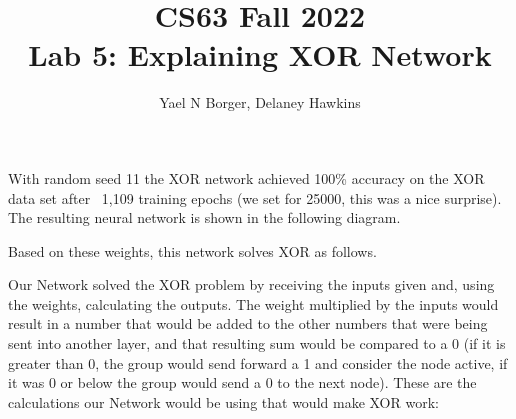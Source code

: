 \documentclass[11pt]{article}
\title{CS63 Fall 2022\\Lab 5: Explaining XOR Network}
\author{Yael N Borger, Delaney Hawkins}
\begin{document}
\maketitle

With random seed 11
the XOR network achieved 100\% accuracy on the XOR data set after
\ 1,109 %
training epochs (we set for 25000, this was a nice surprise).  The resulting neural network is shown in the
following diagram.

\begin{center}
\end{center}

Based on these weights, this network solves XOR as follows.

Our Network solved the XOR problem by receiving the inputs given and, using the weights, calculating the outputs. The weight multiplied by the inputs would result in a number that would be added to the other numbers that were being sent into another layer, and that resulting sum would be compared to a 0 (if it is greater than 0, the group would send forward a 1 and consider the node active, if it was 0 or below the group would send a 0 to the next node). These are the calculations our Network would be using that would make XOR work:
\end{document}
